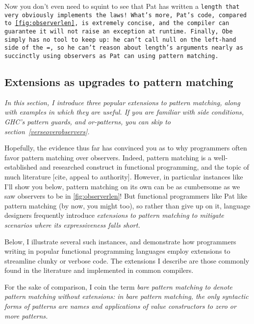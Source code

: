 \documentclass[manuscript,screen,review, 12pt]{acmart}
\begin{document}
    Now you don't even need to squint to see that Pat has written a \tt{length}
    that very obviously implements the laws! What's more, Pat's code, compared
    to~\ref{fig:observerlen}, is extremely concise, and the compiler can
    guarantee it will not raise an exception at runtime. Finally, Obe simply has
    no tool to keep up: he can't call \tt{null} on the left-hand side of the
    \tt{=}, so he can't reason about \tt{length}'s arguments nearly as
    succinctly using observers as Pat can using pattern matching. 


    

\subsection{Extensions as upgrades to pattern matching}
\label{extensions}
    \it{In this section, I introduce three popular extensions to pattern
    matching, along with examples in which they are useful. If you are familiar
    with side conditions, GHC's pattern guards, and or-patterns, you can skip to
    section~\ref{verseoverobservers}.}

    Hopefully, the evidence thus far has convinced you as to why programmers
    often favor pattern matching over observers. Indeed, pattern matching is a
    well-established and researched construct in functional programming, and the
    topic of much literature [cite, appeal to authority]. However, in particular
    instances like I'll show you below, pattern matching on its own can be as
    cumbersome as we saw observers to be in \ref{fig:observerlen}! But
    functional programmers like Pat like pattern matching (by now, you might
    too), so rather than give up on it, language designers frequently introduce
    \it{extensions} to pattern matching to mitigate scenarios where its
    expressiveness falls short. 
    
    Below, I illustrate several such instances, and demonstrate how programmers
    writing in popular functional programming languages employ extensions to
    streamline clunky or verbose code. The extensions I describe are those
    commonly found in the literature and implemented in common compilers.
    
    For the sake of comparison, I coin the term \it{bare pattern matching} to
    denote pattern matching \it{without} extensions: in bare pattern matching,
    the only syntactic forms of patterns are names and applications of value
    constructors to zero or more patterns. 
    
\end{document}
